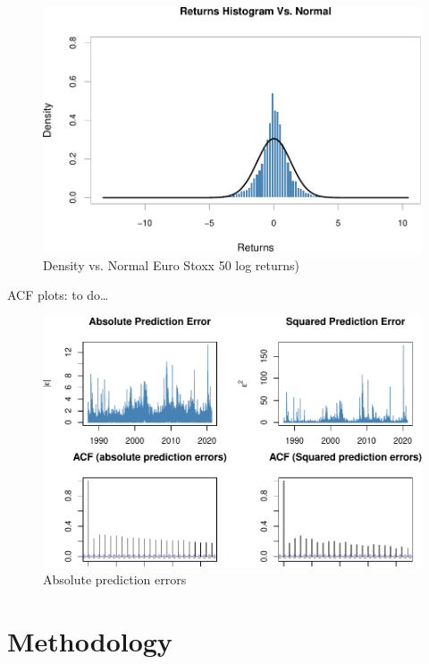 \documentclass[a4paper, twoside]{templates/ociamthesis}
\begin{document}
\begin{figure}

{\centering \includegraphics[width=0.75\linewidth]{_main_files/figure-latex/plot4-1} 

}

\caption{Density vs. Normal Euro Stoxx 50 log returns)}\label{fig:plot4}
\end{figure}

\newpage

\noindent ACF plots: to do\ldots{}

\begin{figure}[h]

{\centering \includegraphics[width=1\linewidth]{_main_files/figure-latex/acfplots-1} 

}

\caption{Absolute prediction errors}\label{fig:acfplots}
\end{figure}

\clearpage

\hypertarget{methodology}{%
\section{Methodology}\label{methodology}}
\end{document}
